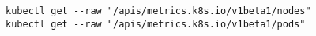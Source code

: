 \begin{verbatim}
kubectl get --raw "/apis/metrics.k8s.io/v1beta1/nodes"
kubectl get --raw "/apis/metrics.k8s.io/v1beta1/pods"
\end{verbatim}
